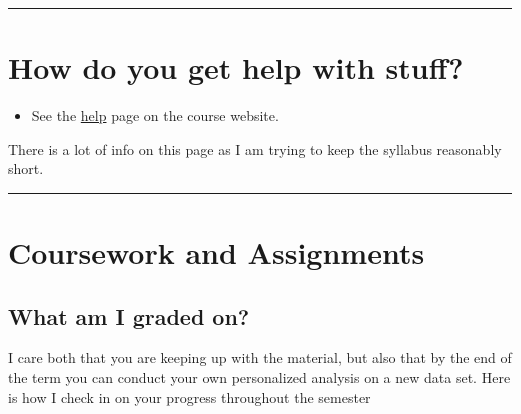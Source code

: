 \documentclass[
  letterpaper,
  DIV=11,
  numbers=noendperiod]{scrartcl}
\providecommand{\tightlist}{%
  \setlength{\itemsep}{0pt}\setlength{\parskip}{0pt}}\usepackage{longtable,booktabs,array}
\begin{document}
\begin{center}\rule{0.5\linewidth}{0.5pt}\end{center}

\hypertarget{how-do-you-get-help-with-stuff}{%
\section{How do you get help with
stuff?}\label{how-do-you-get-help-with-stuff}}

\begin{itemize}
\tightlist
\item
  See the \href{help.html}{help} page on the course website.
\end{itemize}

There is a lot of info on this page as I am trying to keep the syllabus
reasonably short.

\begin{center}\rule{0.5\linewidth}{0.5pt}\end{center}

\hypertarget{coursework-and-assignments}{%
\section{Coursework and Assignments}\label{coursework-and-assignments}}

\hypertarget{what-am-i-graded-on}{%
\subsection{What am I graded on?}\label{what-am-i-graded-on}}

I care both that you are keeping up with the material, but also that by
the end of the term you can conduct your own personalized analysis on a
new data set. Here is how I check in on your progress throughout the
semester
\end{document}
